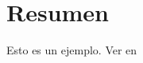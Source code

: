 \chapter*{Resumen}
\thispagestyle{empty}
\label{cap:resumen}

Esto es un ejemplo. Ver en  \cite{darwin2009origen} \cite{del1984luces}

\afterpage{\null\newpage}